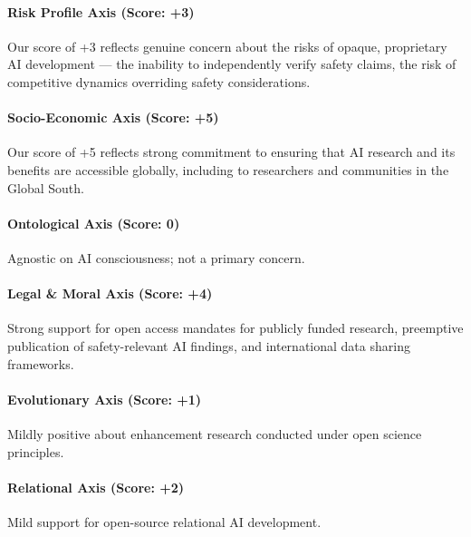 \paragraph{Risk Profile Axis (Score:
+3)}\label{risk-profile-axis-score-3-1}

Our score of +3 reflects genuine concern about the risks of opaque,
proprietary AI development --- the inability to independently verify
safety claims, the risk of competitive dynamics overriding safety
considerations.

\paragraph{Socio-Economic Axis (Score:
+5)}\label{socio-economic-axis-score-5}

Our score of +5 reflects strong commitment to ensuring that AI research
and its benefits are accessible globally, including to researchers and
communities in the Global South.

\paragraph{Ontological Axis (Score:
0)}\label{ontological-axis-score-0-11}

Agnostic on AI consciousness; not a primary concern.

\paragraph{Legal \& Moral Axis (Score:
+4)}\label{legal-moral-axis-score-4-2}

Strong support for open access mandates for publicly funded research,
preemptive publication of safety-relevant AI findings, and international
data sharing frameworks.

\paragraph{Evolutionary Axis (Score:
+1)}\label{evolutionary-axis-score-1-1}

Mildly positive about enhancement research conducted under open science
principles.

\paragraph{Relational Axis (Score: +2)}\label{relational-axis-score-2-5}

Mild support for open-source relational AI development.

